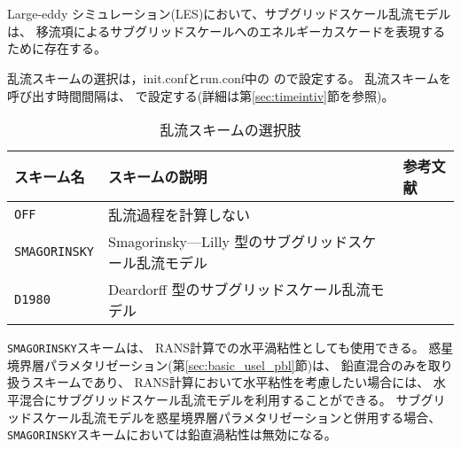 \section{\SubsecTurbulenceSetting} \label{sec:basic_usel_turbulence}

Large-eddy シミュレーション(LES)において、サブグリッドスケール乱流モデルは、
移流項によるサブグリッドスケールへのエネルギーカスケードを表現するために存在する。

乱流スキームの選択は，init.confとrun.conf中の
ので設定する。
乱流スキームを呼び出す時間間隔は、
で設定する(詳細は第\ref{sec:timeintiv}節を参照)。

\begin{table}[h]
\begin{center}
  \caption{乱流スキームの選択肢}
  \label{tab:nml_atm_tb}
  \begin{tabularx}{150mm}{lXX} \hline
    \rowcolor[gray]{0.9}  スキーム名 & スキームの説明 & 参考文献\\ \hline
      \verb|OFF|          & 乱流過程を計算しない &  \\
      \verb|SMAGORINSKY|  & Smagorinsky—Lilly 型のサブグリッドスケール乱流モデル & \citet{smagorinsky_1963,lilly_1962,Brown_etal_1994,Scotti_1993} \\
      \verb|D1980|        & Deardorff 型のサブグリッドスケール乱流モデル & \citet{Deardorff_1980} \\
    \hline
  \end{tabularx}
\end{center}
\end{table}

\verb|SMAGORINSKY|スキームは、 RANS計算での水平渦粘性としても使用できる。
惑星境界層パラメタリゼーション(第\ref{sec:basic_usel_pbl}節)は、
鉛直混合のみを取り扱うスキームであり、
RANS計算において水平粘性を考慮したい場合には、
水平混合にサブグリッドスケール乱流モデルを利用することができる。
サブグリッドスケール乱流モデルを惑星境界層パラメタリゼーションと併用する場合、
\verb|SMAGORINSKY|スキームにおいては鉛直渦粘性は無効になる。
